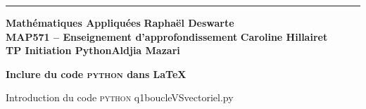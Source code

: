 \documentclass[article,10pt]{amsart}
\title{}
\begin{document}
\hrule \vspace*{2pt}
\noindent 
\textbf{Math\'ematiques Appliqu\'ees}
\hfill \textbf{Rapha\"el Deswarte} \\
\textbf{MAP571 -- Enseignement d'approfondissement}    \hfill \textbf{Caroline Hillairet} \\
\textbf{TP Initiation Python}\hfill \textbf{Aldjia Mazari}

\vspace*{2pt}

\begin{center}
  \Large \textbf{ Inclure du code \textsc{python} dans \LaTeX}
\end{center}

\vspace*{10pt}
Introduction du code \textsc{python} q1boucleVSvectoriel.py

\end{document}
